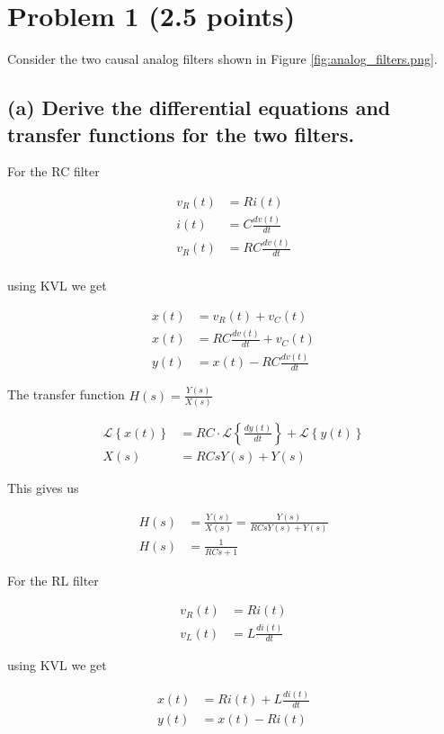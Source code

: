 \section{Problem 1 (2.5 points)}
Consider the two causal analog filters shown in Figure \ref{fig:analog_filters.png}.

\subsection*{(a) Derive the differential equations and transfer functions for the two filters.}

For the RC filter

\begin{align*}
    v_R(t)&=Ri(t)\\
    i(t)&=C\frac{dv(t)}{dt}\\
    v_R(t)&=RC\frac{dv(t)}{dt}\\
\end{align*}

using KVL we get

\begin{align*}
    x(t)&=v_R(t)+v_C(t)\\
    x(t)&=RC\frac{dv(t)}{dt}+v_C(t)\\
    y(t)&=x(t)-RC\frac{dv(t)}{dt}
\end{align*}

The transfer function $H(s)=\frac{Y(s)}{X(s)}$ 

\begin{align*}
    \mathcal{L}\left\{ x(t)\right\} &= R C \cdot \mathcal{L}\left\{ \frac{dy(t)}{dt}\right\}+\mathcal{L}\left\{ y(t)\right\} \\
    X(s) &= R C s Y(s) + Y(s)
\end{align*}

This gives us

\begin{align*}
    H(s)&=\frac{Y(s)}{X(s)}=\frac{Y(s)}{R C s Y(s) + Y(s)}\\
    H(s)&=\frac{1}{RCs+1}
\end{align*}

For the RL filter

\begin{align*}
    v_R(t)&=Ri(t)\\
    v_L(t)&=L\frac{di(t)}{dt}
\end{align*}

using KVL we get

\begin{align*}
    x(t)&=Ri(t)+L\frac{di(t)}{dt}\\
    y(t)&=x(t)-Ri(t)
\end{align*}


